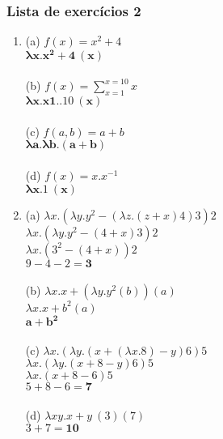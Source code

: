 \documentclass{article}
\begin{document}
\subsubsection*{Lista de exercícios 2}
\begin{enumerate}\bfseries
    \item (a) $f(x) = x^2 + 4$ \\
    $\mathbf{\lambda x.x^2 + 4\ (x)}$ \\ \\
    (b) $f(x) = \sum_{x=1}^{x=10} x$ \\
    $\mathbf{\lambda x.x{1..10}\  (x)}$ \\ \\
    (c) $f(a, b) = a + b$ \\
    $\mathbf{\lambda a.\lambda b.(a+b)}$ \\ \\
    (d) $f(x) = x.x^{-1}$ \\
    $\mathbf{\lambda x.1\ (x)}$

    \item (a) $\lambda x.(\lambda y.y^2 - (\lambda z.(z+x)4)3)2$ \\
    $\lambda x.(\lambda y.y^2 - (4+x)3)2$ \\
    $\lambda x.(3^2 - (4+x))2$ \\
    $9 - 4 - 2 = \mathbf{3}$ \\ \\
    (b) $\lambda x.x + (\lambda y.y^2(b))(a)$ \\
    $\lambda x.x + b^2 (a)$ \\
    $\mathbf{a + b^2}$ \\ \\
    (c) $\lambda x.(\lambda y.(x + (\lambda x.8) - y)6)5$ \\
    $\lambda x.(\lambda y.(x + 8 - y)6)5$ \\
    $\lambda x.(x + 8 - 6)5$ \\
    $5 + 8 - 6 = \mathbf{7}$ \\ \\
    (d) $\lambda xy.x + y\ (3)(7)$ \\
    $3 + 7 = \mathbf{10}$


\end{enumerate}
\end{document}
